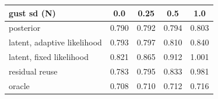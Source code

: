 \begin{tabular}{lcccc}
\toprule
gust sd (N) & 0.0 & 0.25 & 0.5 & 1.0 \\
\midrule
posterior & 0.790 & 0.792 & 0.794 & 0.803 \\
latent, adaptive likelihood & 0.793 & 0.797 & 0.810 & 0.840 \\
latent, fixed likelihood & 0.821 & 0.865 & 0.912 & 1.001 \\
residual reuse & 0.783 & 0.795 & 0.833 & 0.981 \\
oracle & 0.708 & 0.710 & 0.712 & 0.716 \\
\bottomrule
\end{tabular}
